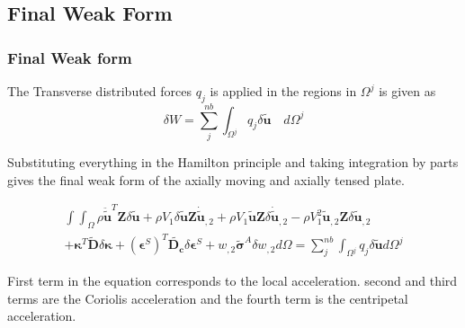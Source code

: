 \documentclass[9pt]{beamer}
\newcommand{\vect}[1]{\boldsymbol{#1}}
\begin{document}
\subsection{Final Weak Form}
\begin{frame}\frametitle{Final Weak form}



The Transverse distributed forces $q_j$ is applied in the regions in $\Omega^j$ is given as
\begin{equation*}\label{eq:vr_W}
\delta W=\sum_j^{nb} \int_{\Omega^j} q_j \delta \vect{\tilde{u}} \quad  d \Omega^j
\end{equation*}


Substituting everything in the Hamilton principle and taking integration by parts gives the final weak form of the axially moving and axially tensed plate.



\begin{equation*}
\begin{split}
\int \int_\Omega 
\rho \vect{\ddot{\tilde{u}}}^T \vect{Z} \delta \vect {{\tilde{u}}}
+  
\rho V_1 \delta \vect{\tilde{u}} \vect{Z} \vect{\dot{\tilde{u}}}_{,2} 
+ 
\rho V_1  \vect{\tilde{u}} \vect{Z} \delta \vect{\dot{\tilde{u}}}_{,2} 
-
\rho V_1^2 \vect{\tilde{u}}_{,2} \vect{Z} \delta \vect{\tilde{u}}_{,2}
\\ 
+ 
\vect{\kappa}^T \vect{\tilde{D}} \delta \vect{\kappa} 
+
\left(\vect{\epsilon}^S\right)^T \vect{\tilde{D_c}} \delta\vect{\epsilon}^S 
+
 w_{, 2} \vect{\tilde{\sigma}}^A  \delta w_{, 2}  d \Omega     
 =  
\sum_j^{nb} \int_{\Omega^j} q_j \delta \vect{\tilde{u}}  d \Omega^j 
\end{split} 
\end{equation*}

First term in the equation corresponds to the local acceleration. second and third terms are the Coriolis acceleration and the fourth term is the centripetal acceleration.

\end{frame}
\end{document}
